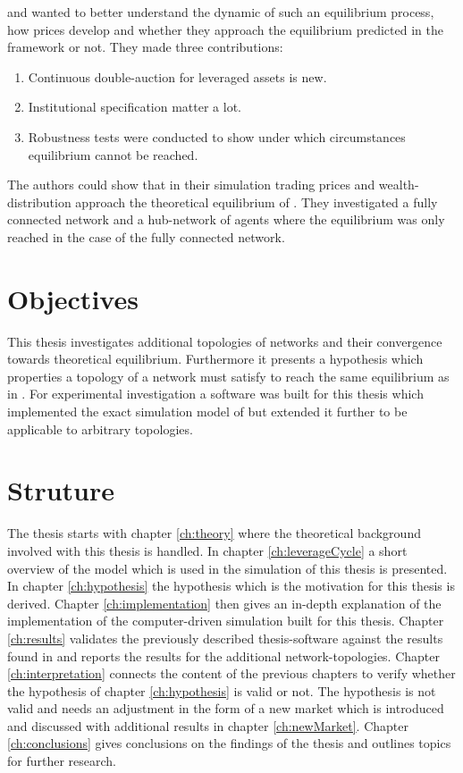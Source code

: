 \documentclass[Bachelorarbeit.tex]{subfiles}
\begin{document}
and wanted to better understand the dynamic of such an equilibrium process, how prices develop and whether they approach the equilibrium predicted in the framework or not. They made three contributions:

\begin{enumerate}
\item Continuous double-auction for leveraged assets is new.
\item Institutional specification matter a lot.
\item Robustness tests were conducted to show under which circumstances equilibrium cannot be reached.
\end{enumerate}

The authors could show that in their simulation trading prices and wealth-distribution approach the theoretical equilibrium of \cite{Geanakoplos2009}. They investigated a fully connected network and a hub-network of agents where the equilibrium was only reached in the case of the fully connected network. 

\section{Objectives}
This thesis investigates additional topologies of networks and their convergence towards theoretical equilibrium. Furthermore it presents a hypothesis which properties a topology of a network must satisfy to reach the same equilibrium as in \cite{Breuer2015}. For experimental investigation a software was built for this thesis which implemented the exact simulation model of \cite{Breuer2015} but extended it further to be applicable to arbitrary topologies.

\section{Struture}
The thesis starts with chapter \ref{ch:theory} where the theoretical background involved with this thesis is handled. In chapter \ref{ch:leverageCycle} a short overview of the model which is used in the simulation of this thesis is presented. In chapter \ref{ch:hypothesis} the hypothesis which is the motivation for this thesis is derived. Chapter \ref{ch:implementation} then gives an in-depth explanation of the implementation of the computer-driven simulation built for this thesis. Chapter \ref{ch:results} validates the previously described thesis-software against the results found in \cite{Breuer2015} and reports the results for the additional network-topologies. Chapter \ref{ch:interpretation} connects the content of the previous chapters to verify whether the hypothesis of chapter \ref{ch:hypothesis} is valid or not. The hypothesis is not valid and needs an adjustment in the form of a new market which is introduced and discussed with additional results in chapter \ref{ch:newMarket}. Chapter \ref{ch:conclusions} gives conclusions on the findings of the thesis and outlines topics for further research.
\end{document}
